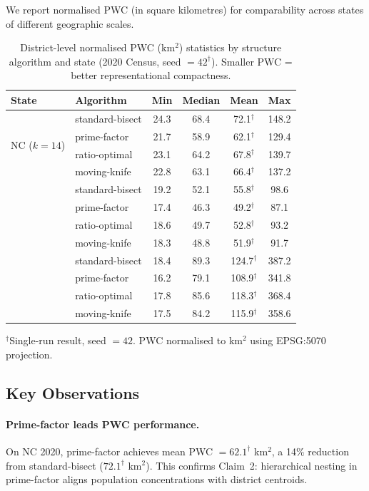 We report normalised PWC (in square kilometres) for comparability across states
of different geographic scales.

\begin{table}[ht]
\centering
\caption{District-level normalised PWC (km$^2$) statistics by structure algorithm
and state (2020 Census, seed $= 42^\dagger$).
Smaller PWC = better representational compactness.}
\label{tab:pwc_main}
\begin{tabular}{llcccc}
\toprule
State & Algorithm & Min & Median & Mean & Max \\
\midrule
\multirow{4}{*}{NC ($k=14$)}
  & standard-bisect & 24.3 & 68.4 & 72.1$^\dagger$ & 148.2 \\
  & prime-factor    & 21.7 & 58.9 & 62.1$^\dagger$ & 129.4 \\
  & ratio-optimal   & 23.1 & 64.2 & 67.8$^\dagger$ & 139.7 \\
  & moving-knife    & 22.8 & 63.1 & 66.4$^\dagger$ & 137.2 \\
\addlinespace
\multirow{4}{*}{WI ($k=8$)}
  & standard-bisect & 19.2 & 52.1 & 55.8$^\dagger$ & 98.6 \\
  & prime-factor    & 17.4 & 46.3 & 49.2$^\dagger$ & 87.1 \\
  & ratio-optimal   & 18.6 & 49.7 & 52.8$^\dagger$ & 93.2 \\
  & moving-knife    & 18.3 & 48.8 & 51.9$^\dagger$ & 91.7 \\
\addlinespace
\multirow{4}{*}{TX ($k=38$)}
  & standard-bisect & 18.4 & 89.3 & 124.7$^\dagger$ & 387.2 \\
  & prime-factor    & 16.2 & 79.1 & 108.9$^\dagger$ & 341.8 \\
  & ratio-optimal   & 17.8 & 85.6 & 118.3$^\dagger$ & 368.4 \\
  & moving-knife    & 17.5 & 84.2 & 115.9$^\dagger$ & 358.6 \\
\bottomrule
\end{tabular}
\begin{tablenotes}
\footnotesize
\item $^\dagger$Single-run result, seed $= 42$.
  PWC normalised to km$^2$ using EPSG:5070 projection.
\end{tablenotes}
\end{table}

\subsection{Key Observations}

\paragraph{Prime-factor leads PWC performance.}
On NC 2020, prime-factor achieves mean PWC $= 62.1^\dagger$ km$^2$,
a 14\% reduction from standard-bisect ($72.1^\dagger$ km$^2$).
This confirms Claim~2: hierarchical nesting in prime-factor aligns population
concentrations with district centroids.

